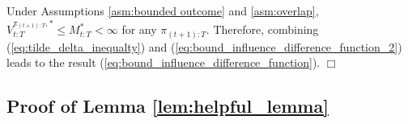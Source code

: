 Under Assumptions \ref{asm:bounded outcome} and \ref{asm:overlap}, $V_{t:T}^{\pi_{(t+1):T},\ast} \leq M_{t:T}^{\ast} < \infty$ for any $\pi_{(t+1):T}$. Therefore, combining (\ref{eq:tilde_delta_inequalty}) and (\ref{eq:bound_influence_difference_function_2}) leads to the result (\ref{eq:bound_influence_difference_function}). \hfill {\large $\Box$}

\medskip{}

\subsection{Proof of Lemma \ref{lem:helpful_lemma}}\label{app:proofs_of_main_lemmas}

